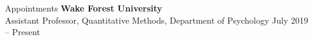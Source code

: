 \begin{rSection}{\textrm{Appointments}}
{\bf Wake Forest University}\\
Assistant Professor, Quantitative Methods, Department of Psychology \hfill{July 2019 – Present}
\end{rSection}